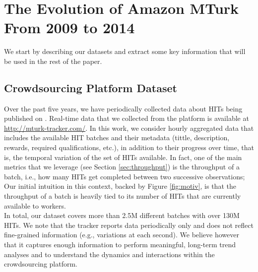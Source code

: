 \section{The Evolution of Amazon MTurk\\ From 2009 to 2014}
\label{sec:stats}

We start by describing our datasets and extract some key information that will be used in the rest of the paper.

\subsection{Crowdsourcing Platform Dataset}
\label{sec:tracker}
Over the past five years, we have periodically collected data about HITs being published on \amt{}.
Real-time data that we collected from the platform is available at \url{http://mturk-tracker.com/}. In this work, we consider hourly aggregated data that includes the available HIT batches and their metadata (tittle, description, rewards, required qualifications, etc.), in addition to their progress over time, that is, the temporal variation of the set of HITs available. In fact, one of the main metrics that we leverage (see Section \ref{sec:throughput}) is the throughput of a batch, i.e., how many HITs  get completed between two successive observations; Our initial intuition in this context, backed by Figure \ref{fig:motiv}, is that the throughput of a batch is heavily tied to its number of HITs that are currently available to workers.\\
In total, our dataset covers more than 2.5M different batches with over 130M HITs.
We note that the tracker reports data periodically only and does not reflect fine-grained information (e.g., variations at each second). We believe however that it captures enough information to perform meaningful, long-term trend analyses and to understand the dynamics and interactions within the crowdsourcing platform.\\

